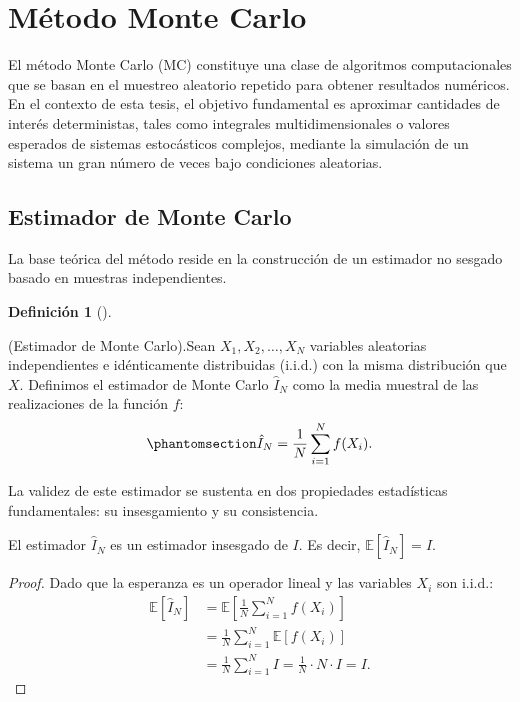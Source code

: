 \documentclass[
  spanish,
  us-letterpaper,
]{scrreprt}
\theoremstyle{plain}
\theoremstyle{plain}
\theoremstyle{definition}
\newtheorem{definition}{Definición}[chapter]
\theoremstyle{remark}
\begin{document}
\section{Método Monte Carlo}\label{muxe9todo-monte-carlo}

El método Monte Carlo (MC) constituye una clase de algoritmos
computacionales que se basan en el muestreo aleatorio repetido para
obtener resultados numéricos. En el contexto de esta tesis, el objetivo
fundamental es aproximar cantidades de interés deterministas, tales como
integrales multidimensionales o valores esperados de sistemas
estocásticos complejos, mediante la simulación de un sistema un gran
número de veces bajo condiciones aleatorias.

\subsection{Estimador de Monte Carlo}\label{estimador-de-monte-carlo}

La base teórica del método reside en la construcción de un estimador no
sesgado basado en muestras independientes.

\begin{definition}[]\protect\hypertarget{def-Espacio_probabilidad_filtrado}{}\label{def-Espacio_probabilidad_filtrado}

(Estimador de Monte Carlo).Sean \(X_1, X_2, \dots, X_N\) variables
aleatorias independientes e idénticamente distribuidas (i.i.d.) con la
misma distribución que \(X\). Definimos el estimador de Monte Carlo
\(\hat{I}_N\) como la media muestral de las realizaciones de la función
\(f\):
\begin{equation}\protect\phantomsection\label{eq-mc_estimator}{ \hat{I}_N = \frac{1}{N} \sum_{i=1}^{N} f(X_i).}\end{equation}

\end{definition}

La validez de este estimador se sustenta en dos propiedades estadísticas
fundamentales: su insesgamiento y su consistencia.

El estimador \(\hat{I}_N\) es un estimador insesgado de \(I\). Es decir,
\(\mathbb{E}[\hat{I}_N] = I\).

\begin{proof}
Dado que la esperanza es un operador lineal y las variables \(X_i\) son
i.i.d.: \[\begin{aligned}
    \mathbb{E}[\hat{I}_N] &= \mathbb{E}\left[ \frac{1}{N} \sum_{i=1}^{N} f(X_i) \right] \\
    &= \frac{1}{N} \sum_{i=1}^{N} \mathbb{E}[f(X_i)] \\
    &= \frac{1}{N} \sum_{i=1}^{N} I = \frac{1}{N} \cdot N \cdot I = I.
\end{aligned}\]
\end{proof}
\end{document}
